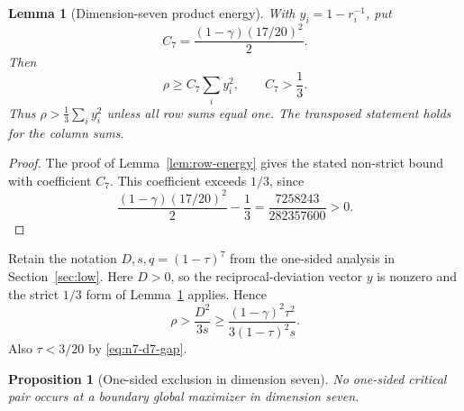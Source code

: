 \documentclass[11pt,a4paper]{article}
\numberwithin{equation}{section}
\newtheorem{lemma}[theorem]{Lemma}
\newtheorem{proposition}[theorem]{Proposition}
\theoremstyle{definition}
\newcommand{\1}{\mathbf{1}}
\begin{document}
\begin{lemma}[Dimension-seven product energy]\label{lem:n7-product-energy}
With $y_i=1-r_i^{-1}$, put
\[
 C_7=\frac{(1-\gamma)(17/20)^2}{2}.
\]
Then
\begin{equation}\label{eq:n7-product-energy}
 \rho\ge C_7\sum_i y_i^2,
 \qquad C_7>\frac13.
\end{equation}
Thus $\rho>\frac13\sum_i y_i^2$ unless all row sums equal one.  The
transposed statement holds for the column sums.
\end{lemma}

\begin{proof}
The proof of Lemma~\ref{lem:row-energy} gives the stated non-strict
bound with coefficient $C_7$.  This coefficient exceeds $1/3$, since
\[
 \frac{(1-\gamma)(17/20)^2}{2}-\frac13
 =\frac{7258243}{282357600}>0.
\]
\end{proof}

Retain the notation $D,s,q=(1-\tau)^7$ from the one-sided analysis in
Section~\ref{sec:low}.  Here $D>0$, so the reciprocal-deviation vector
$y$ is nonzero and the strict $1/3$ form of
Lemma~\ref{lem:n7-product-energy} applies.  Hence
\begin{equation}\label{eq:n7-one-sided-energy}
 \rho>\frac{D^2}{3s}
 \ge
 \frac{(1-\gamma)^2\tau^2}{3(1-\tau)^2s}.
\end{equation}
Also $\tau<3/20$ by \eqref{eq:n7-d7-gap}.

\begin{proposition}[One-sided exclusion in dimension seven]
\label{prop:n7-one-sided}
No one-sided critical pair occurs at a boundary global maximizer in dimension
seven.
\end{proposition}
\end{document}
